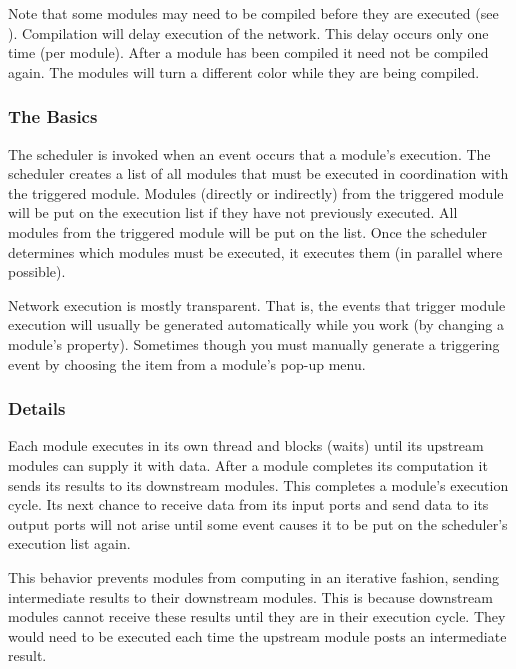 Note that some modules may need to be compiled before they are
executed (see ).  Compilation
will delay execution of the network.  This delay occurs only one time
(per module).  After a module has been compiled it need not be
compiled again.  The modules will turn a different color while they
are being compiled.


\subsubsection{The Basics}

The scheduler is invoked when an event occurs that  a
module's execution.  The scheduler creates a list of all modules that
must be executed in coordination with the triggered module. Modules
 (directly or indirectly) from the triggered module will
be put on the execution list if they have not previously executed.
All modules  from the triggered module will be put
on the list.  Once the scheduler determines which modules must be
executed, it executes them (in parallel where possible).

Network execution is mostly transparent.  That is, the events that trigger
module execution will usually be generated automatically while you work
(\eg by changing a module's property).  Sometimes though you must manually
generate a triggering event by choosing the  item from a
module's pop-up menu.

\subsubsection{Details}

Each module executes in its own thread and blocks (waits) until its upstream
modules can supply it with data.  After a module completes its computation
it sends its results to its downstream modules.  This completes a module's
execution cycle.  Its next chance to receive data from its input ports
and send data to its output ports will not arise until some event
causes it to be put on the scheduler's execution list again.  

This behavior prevents modules from computing in an iterative fashion,
sending intermediate results to their downstream modules.  This is because
downstream modules cannot receive these results until they are in their
execution cycle.  They would need to be executed each time the
upstream module posts an intermediate result.



